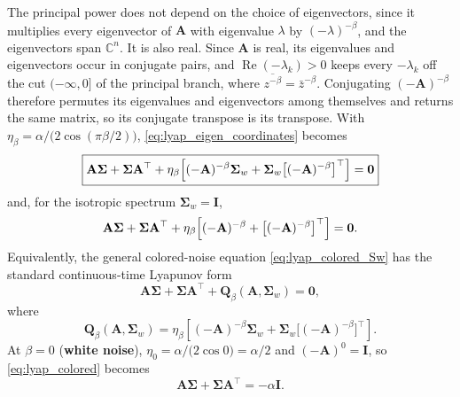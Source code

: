 \documentclass[12pt]{article}
\begin{document}
The principal power does not depend on the choice of eigenvectors, since it multiplies every eigenvector of $\mathbf{A}$ with
eigenvalue $\lambda$ by $(-\lambda)^{-\beta}$, and the eigenvectors span $\mathbb{C}^n$. It is also real. Since $\mathbf{A}$ is real,
its eigenvalues and eigenvectors occur in conjugate pairs, and $\operatorname{Re}(-\lambda_k)>0$ keeps every $-\lambda_k$ off the cut
$(-\infty,0]$ of the principal branch, where $\overline{z^{-\beta}}=\bar z^{-\beta}$. Conjugating $(-\mathbf{A})^{-\beta}$ therefore
permutes its eigenvalues and eigenvectors among themselves and returns the same matrix, so its conjugate transpose is its
transpose. With $\eta_\beta=\alpha/\bigl(2\cos(\pi\beta/2)\bigr)$, \eqref{eq:lyap_eigen_coordinates} becomes
\begin{equation}
\boxed{\mathbf{A}\boldsymbol{\Sigma}+\boldsymbol{\Sigma}\mathbf{A}^\top
    +\eta_\beta\Bigl[(-\mathbf{A})^{-\beta}\boldsymbol{\Sigma}_w
    +\boldsymbol{\Sigma}_w\bigl[(-\mathbf{A})^{-\beta}\bigr]^{\top}\Bigr]=\mathbf{0}}
    \label{eq:lyap_colored_Sw}
\end{equation}
and, for the isotropic spectrum $\boldsymbol{\Sigma}_w=\mathbf{I}$,
\begin{equation}
    \mathbf{A}\boldsymbol{\Sigma}+\boldsymbol{\Sigma}\mathbf{A}^\top
    +\eta_\beta\Bigl[(-\mathbf{A})^{-\beta}+\bigl[(-\mathbf{A})^{-\beta}\bigr]^{\top}\Bigr]=\mathbf{0} .
    \label{eq:lyap_colored}
\end{equation}
Equivalently, the general colored-noise equation \eqref{eq:lyap_colored_Sw} has the standard continuous-time Lyapunov form
\begin{equation}
\mathbf A\boldsymbol\Sigma+\boldsymbol\Sigma\mathbf A^\top+
\mathbf Q_\beta(\mathbf A,\boldsymbol\Sigma_w)=\mathbf0,
\label{eq:lyap_standard_form}
\end{equation}
where
\begin{equation}
\mathbf Q_\beta(\mathbf A,\boldsymbol\Sigma_w)
=\eta_\beta\!\left[
(-\mathbf A)^{-\beta}\boldsymbol\Sigma_w+
\boldsymbol\Sigma_w\bigl[(-\mathbf A)^{-\beta}\bigr]^\top
\right].
\label{eq:Q_beta}
\end{equation}
At $\beta=0$ (\textbf{white noise}), $\eta_0=\alpha/\bigl(2\cos 0\bigr)=\alpha/2$ and
$(-\mathbf{A})^{0}=\mathbf{I}$, so \eqref{eq:lyap_colored} becomes
\begin{equation}
    \mathbf{A}\boldsymbol{\Sigma}+\boldsymbol{\Sigma}\mathbf{A}^{\top}=-\alpha\mathbf{I}.
    \label{eq:lyap_white_noise}
\end{equation}
\end{document}
